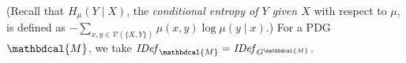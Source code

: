 \documentclass{article}
\theoremstyle{plain}
\theoremstyle{definition}
\theoremstyle{remark}
\newcommand{\V}{\mathcal V}
\newcommand{\dg}[1]{\mathbdcal{#1}}
\newcommand{\IDef}[1]{\mathit{IDef}_{#1}}
\numberwithin{equation}{section}
\begin{document}
\begin{defn}
(Recall that $H_\mu(Y\mid X)$, the
	\emph{conditional entropy of $Y$ given $X$} with respect to $\mu$, is
	defined as 
$- \sum_{x,y \in \V(\{X,Y\})} \mu(x,y) \log \mu(y\mid x)$.)
For a PDG ${\dg M}$, we take $\IDef{\dg M} = \IDef{G^{\dg M}}$.         
\end{defn}
\end{document}
